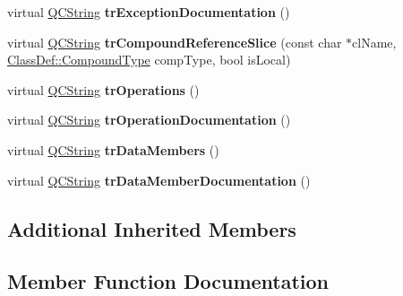 \begin{DoxyCompactItemize}
virtual \mbox{\hyperlink{class_q_c_string}{Q\+C\+String}} {\bfseries tr\+Exception\+Documentation} ()
\item 
\mbox{\label{class_translator_adapter__1__8__15_a1f2373352fb9b4fd9882c60a6d5b91db}} 
virtual \mbox{\hyperlink{class_q_c_string}{Q\+C\+String}} {\bfseries tr\+Compound\+Reference\+Slice} (const char $\ast$cl\+Name, \mbox{\hyperlink{class_class_def_ae70cf86d35fe954a94c566fbcfc87939}{Class\+Def\+::\+Compound\+Type}} comp\+Type, bool is\+Local)
\item 
\mbox{\label{class_translator_adapter__1__8__15_a01b90572d2277f03743e8d61ef8ce74f}} 
virtual \mbox{\hyperlink{class_q_c_string}{Q\+C\+String}} {\bfseries tr\+Operations} ()
\item 
\mbox{\label{class_translator_adapter__1__8__15_ad6dfacece420d455bfe123c61852abc1}} 
virtual \mbox{\hyperlink{class_q_c_string}{Q\+C\+String}} {\bfseries tr\+Operation\+Documentation} ()
\item 
\mbox{\label{class_translator_adapter__1__8__15_aeaccbf1f4d3fa4211af9729deb28fc4f}} 
virtual \mbox{\hyperlink{class_q_c_string}{Q\+C\+String}} {\bfseries tr\+Data\+Members} ()
\item 
\mbox{\label{class_translator_adapter__1__8__15_a23c570ee4b63075a1a539ba590293b87}} 
virtual \mbox{\hyperlink{class_q_c_string}{Q\+C\+String}} {\bfseries tr\+Data\+Member\+Documentation} ()
\end{DoxyCompactItemize}
\subsection*{Additional Inherited Members}


\subsection{Member Function Documentation}
\mbox{\label{class_translator_adapter__1__8__15_a80d2ab2af345124fee8267ad82ac51ed}} 
